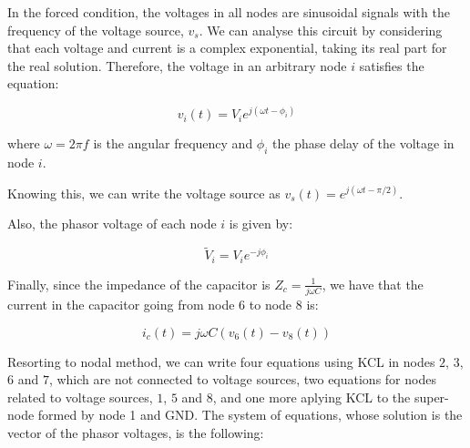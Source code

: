 In the forced condition, the voltages in all nodes are sinusoidal signals with the frequency of the voltage source, $v_s$. We can analyse this circuit by considering that each voltage and current is a complex exponential, taking its real part for the real solution. Therefore, the voltage in an arbitrary node $i$ satisfies the equation:

\begin{equation}
  v_i(t) = V_i e^{j(\omega t - \phi_i)}
\end{equation}

\noindent
where $\omega = 2\pi f$ is the angular frequency and $\phi_i$ the phase delay of the voltage in node $i$. 

Knowing this, we can write the voltage source as $v_s(t) = e^{j(\omega t - \pi/2)}$.
 
Also, the phasor voltage of each node $i$ is given by:

\begin{equation}
  \widetilde{V}_i = V_i e^{-j\phi_i}
\end{equation}

Finally, since the impedance of the capacitor is $Z_c = \frac{1}{j \omega C}$, we have that the current in the capacitor going from node 6 to node 8 is:

\begin{equation}
  i_c(t) = j \omega C (v_6(t)-v_8(t))
\end{equation}

Resorting to nodal method, we can write four equations using KCL in nodes $2$, $3$, $6$ and $7$, which are not connected to voltage sources, two equations for nodes related to voltage sources, $1$, $5$ and $8$, and one more aplying KCL to the super-node formed by node 1 and GND. The system of equations, whose solution is the vector of the phasor voltages, is the following:

